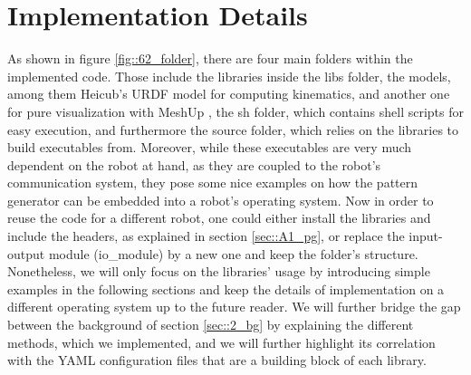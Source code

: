 \section{Implementation Details}
\label{sec::62_id}
As shown in figure \ref{fig::62_folder}, there are four main folders within the implemented code. Those include the libraries inside the libs folder, the models, among them Heicub's URDF model for computing kinematics, and another one for pure visualization with MeshUp \cite{meshup}, the sh folder, which contains shell scripts for easy execution, and furthermore the source folder, which relies on the libraries to build executables from. Moreover, while these executables are very much dependent on the robot at hand, as they are coupled to the robot's communication system, they pose some nice examples on how the pattern generator can be embedded into a robot's operating system. Now in order to reuse the code for a different robot, one could either install the libraries and include the headers, as explained in section \ref{sec::A1_pg}, or replace the input-output module (io\_module) by a new one and keep the folder's structure. Nonetheless, we will only focus on the libraries' usage by introducing simple examples in the following sections and keep the details of implementation on a different operating system up to the future reader. We will further bridge the gap between the background of section \ref{sec::2_bg} by explaining the different methods, which we implemented, and we will further highlight its correlation with the YAML \cite{ben2005yaml} configuration files that are a building block of each library. 
